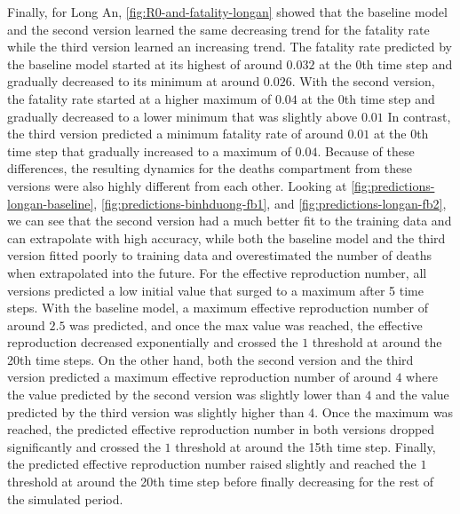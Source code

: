 Finally, for Long An, \autoref{fig:R0-and-fatality-longan} showed that the baseline model and the second version learned the same decreasing trend for the fatality rate while the third version learned an increasing trend.
The fatality rate predicted by the baseline model started at its highest of around $0.032$ at the 0th time step and gradually decreased to its minimum at around $0.026$.
With the second version, the fatality rate started at a higher maximum of $0.04$ at the 0th time step and gradually decreased to a lower minimum that was slightly above $0.01$
In contrast, the third version predicted a minimum fatality rate of around $0.01$ at the 0th time step that gradually increased to a maximum of $0.04$.
Because of these differences, the resulting dynamics for the deaths compartment from these versions were also highly different from each other.
Looking at \autoref{fig:predictions-longan-baseline}, \autoref{fig:predictions-binhduong-fb1}, and \autoref{fig:predictions-longan-fb2}, we can see that the second version had a much better fit to the training data and can extrapolate with high accuracy, while both the baseline model and the third version fitted poorly to training data and overestimated the number of deaths when extrapolated into the future.
For the effective reproduction number, all versions predicted a low initial value that surged to a maximum after 5 time steps.
With the baseline model, a maximum effective reproduction number of around $2.5$ was predicted, and once the max value was reached, the effective reproduction decreased exponentially and crossed the $1$ threshold at around the 20th time steps.
On the other hand, both the second version and the third version predicted a maximum effective reproduction number of around $4$ where the value predicted by the second version was slightly lower than $4$ and the value predicted by the third version was slightly higher than $4$.
Once the maximum was reached, the predicted effective reproduction number in both versions dropped significantly and crossed the $1$ threshold at around the 15th time step.
Finally, the predicted effective reproduction number raised slightly and reached the $1$ threshold at around the 20th time step before finally decreasing for the rest of the simulated period.

